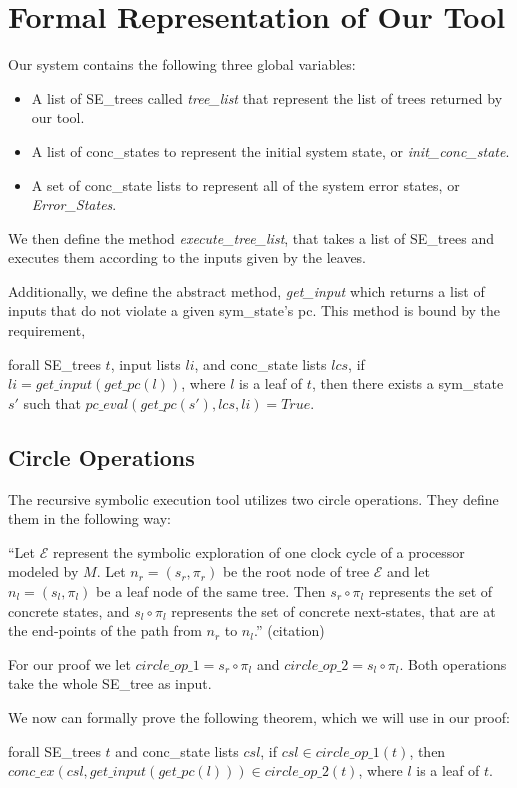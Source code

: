 \section{Formal Representation of Our Tool}
Our system contains the following three global variables:
\begin{itemize}
\item A list of SE\_trees called \textit{tree\_list} that represent the list of trees returned by our tool.
\item A list of conc\_states to represent the initial system state, or \textit{init\_conc\_state}.
\item A set of conc\_state lists to represent all of the system error states, or \textit{Error\_States}.
\end{itemize}

We then define the method \textit{execute\_tree\_list}, that takes a list of SE\_trees and executes them according to the inputs given by the leaves.

Additionally, we define the abstract method, \textit{get\_input} which returns a list of inputs that do not violate a given sym\_state's pc.
This method is bound by the requirement,
\begin{axiom}
forall SE\_trees $t$, input lists $li$, and conc\_state lists $lcs$,  
if $li = get\_input (get\_pc (l)) $, where $l$ is a leaf of $t$,
then there exists a sym\_state $s'$ such that
 $pc\_eval (get\_pc (s'), lcs, li) = True$.
\end{axiom}

\subsection{Circle Operations}
The recursive symbolic execution tool utilizes two circle operations. 
They define them in the following way: 

``Let $\mathcal{E}$ represent the symbolic exploration of one clock cycle of a processor modeled by $M$. Let $n_r = (s_r,\pi_r)$ be the root node of tree $\mathcal{E}$ and let $n_l = (s_l,\pi_l)$ be a leaf node of the same tree. 
Then $s_r \circ \pi_l$ represents the set of concrete states, and $s_l \circ \pi_l$ represents the set of concrete next-states, that are at the end-points of the path from $n_r$ to $n_l$.'' (citation)

For our proof we let $circle\_op\_1 =  s_r \circ \pi_l$ and $circle\_op\_2 =  s_l \circ \pi_l$.
Both operations take the whole SE\_tree as input.

We now can formally prove the following theorem, which we will use in our proof:
\begin{theorem}
forall SE\_trees $t$ and conc\_state lists $csl$,
if $csl \in circle\_op\_1(t)$,
then 
$conc\_ex(csl, get\_input (get\_pc (l))) \in circle\_op\_2(t)$,
where $l$ is a leaf of $t$.
\end{theorem}

